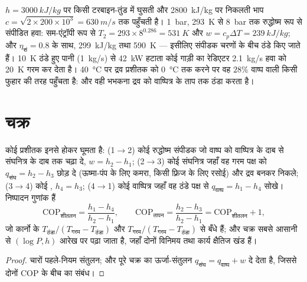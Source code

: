 \begin{example}[यंत्रों के आँकड़े]\label{ex:b2:open-systems:numbers}
$h = \qty{3000}{kJ/kg}$ पर किसी टरबाइन-तुंड में घुसती और
\qty{2800}{kJ/kg} पर निकलती भाप $c = \sqrt{2 \times 200 \times 10^3} =
\qty{630}{m/s}$ तक पहुँचती है। \qty{1}{bar},
\qty{293}{K} से \qty{8}{bar} तक रुद्धोष्म रूप से संपीडित हवा: सम-एंट्रॉपी रूप से $T_2 = 293 \times 8^{0.286} =
\qty{531}{K}$ और $w = c_p\Delta T = \qty{239}{kJ/kg}$; और $\eta_{\text{सं}} =
0.8$ के साथ, \qty{299}{kJ/kg} तथा \qty{590}{K} --- इसीलिए संपीडक चरणों के बीच
ठंडे किए जाते हैं। \qty{10}{K} ठंडे हुए पानी (\qty{1}{kg/s}) से \qty{42}{kW} हटाता कोई
गाड़ी का रेडिएटर \qty{2.1}{kg/s} हवा को \qty{20}{K} गरम कर देता है।
\qty{40}{\celsius} पर द्रव प्रशीतक को \qty{0}{\celsius} तक  करने पर वह
$28\%$ वाष्प वाली किसी फुहार की तरह पहुँचता है: और वही भभकना
द्रव को वाष्पित्र के ताप तक ठंडा करता है।
\end{example}

\section{चक्र}

\begin{proposition}[वाष्प-संपीडन प्रशीतन और ऊष्मा-पंप]\label{prop:b2:open-systems:fridge}
कोई प्रशीतक इनसे होकर घूमता है: (1$\to$2) कोई रुद्धोष्म संपीडक
जो वाष्प को वाष्पित्र के दाब से संघनित्र के
दाब तक चढ़ा दे, $w = h_2 - h_1$; (2$\to$3) कोई संघनित्र जहाँ वह गरम पक्ष को
$q_{\text{संघ}} = h_2 - h_3$ छोड़ दे (ऊष्मा-पंप के लिए कमरा, किसी फ़्रिज के लिए
रसोई) और द्रव बनकर निकले; (3$\to$4) कोई , $h_4
= h_3$; (4$\to$1) कोई वाष्पित्र जहाँ वह ठंडे पक्ष से $q_{\text{वाष्प}} = h_1 - h_4$
सोखे। निष्पादन गुणांक हैं
\[
\mathrm{COP}_{\text{शीतलन}} = \frac{h_1 - h_4}{h_2 - h_1}, \qquad
\mathrm{COP}_{\text{तापन}} = \frac{h_2 - h_3}{h_2 - h_1} = \mathrm{COP}_{\text{शीतलन}} + 1 ,
\]
जो कार्नो के $T_{\text{ठंडा}}/(T_{\text{गरम}} - T_{\text{ठंडा}})$ और
$T_{\text{गरम}}/(T_{\text{गरम}} - T_{\text{ठंडा}})$ से बँधे हैं; और चक्र सबसे आसानी से
$(\log P, h)$ आरेख पर पढ़ा जाता है, जहाँ दोनों विनिमय तथा कार्य
क्षैतिज खंड हैं।
\end{proposition}

\begin{proof}
चारों पहले-नियम संतुलन; और पूरे चक्र का ऊर्जा-संतुलन
$q_{\text{संघ}} = q_{\text{वाष्प}} + w$ दे देता है, जिससे
दोनों COP के बीच का संबंध।
\end{proof}

